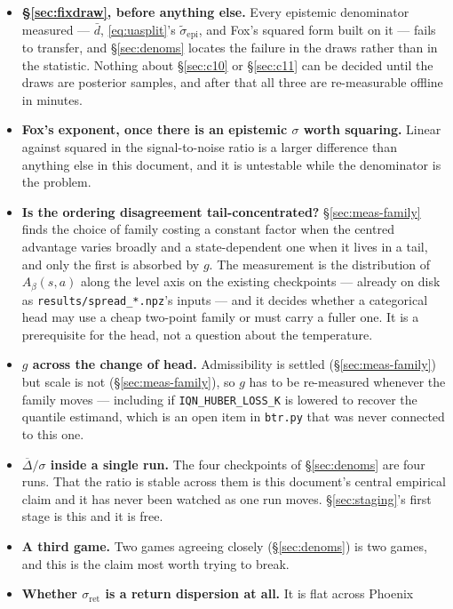\documentclass{article}
\newcommand{\gapbar}{\overline{\Delta}}
\newcommand{\dbar}{\bar{d}}
\newcommand{\sret}{\sigma_{\mathrm{ret}}}
\newcommand{\srank}{\sigma}
\begin{document}
\begin{itemize}
  \item \textbf{\S\ref{sec:fixdraw}, before anything else.} Every epistemic denominator
  measured --- $\dbar$, \eqref{eq:uasplit}'s $\tilde\sigma_{\mathrm{epi}}$, and Fox's squared
  form built on it --- fails to transfer, and \S\ref{sec:denoms} locates the failure in the
  draws rather than in the statistic. Nothing about \S\ref{sec:c10} or \S\ref{sec:c11} can be
  decided until the draws are posterior samples, and after that all three are re-measurable
  offline in minutes.
  \item \textbf{Fox's exponent, once there is an epistemic $\sigma$ worth squaring.} Linear
  against squared in the signal-to-noise ratio is a larger difference than anything else in this
  document, and it is untestable while the denominator is the problem.
  \item \textbf{Is the ordering disagreement tail-concentrated?} \S\ref{sec:meas-family} finds
  the choice of family costing a constant factor when the centred advantage varies broadly and a
  state-dependent one when it lives in a tail, and only the first is absorbed by $g$. The
  measurement is
  the distribution of $A_\beta(s,a)$ along the level axis on the existing checkpoints --- already
  on disk as \texttt{results/spread\_*.npz}'s inputs --- and it decides whether a categorical head
  may use a cheap two-point family or must carry a fuller one. It is a prerequisite for the
  head, not a question about the temperature.
  \item \textbf{$g$ across the change of head.} Admissibility is settled (\S\ref{sec:meas-family})
  but scale is not (\S\ref{sec:meas-family}), so $g$ has to be re-measured whenever the family
  moves --- including if
  \texttt{IQN\_HUBER\_LOSS\_K} is lowered to recover the quantile estimand, which is an open item
  in \texttt{btr.py} that was never connected to this one.
  \item \textbf{$\gapbar/\srank$ inside a single run.} The four checkpoints of
  \S\ref{sec:denoms} are four runs. That the ratio is stable across them is this document's
  central empirical claim and it has never been watched as one run moves. \S\ref{sec:staging}'s
  first stage is this and it is free.
  \item \textbf{A third game.} Two games agreeing closely (\S\ref{sec:denoms}) is two games, and
  this is the claim
  most worth trying to break.
  \item \textbf{Whether $\sret$ is a return dispersion at all.} It is flat across Phoenix

\end{itemize}
\end{document}
